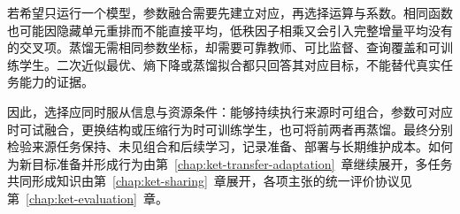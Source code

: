 若希望只运行一个模型，参数融合需要先建立对应，再选择运算与系数。相同函数也可能因隐藏单元重排而不能直接平均，低秩因子相乘又会引入完整增量平均没有的交叉项。蒸馏无需相同参数坐标，却需要可靠教师、可比监督、查询覆盖和可训练学生。二次近似最优、熵下降或蒸馏拟合都只回答其对应目标，不能替代真实任务能力的证据。

因此，选择应同时服从信息与资源条件：能够持续执行来源时可组合，参数可对应时可试融合，更换结构或压缩行为时可训练学生，也可将前两者再蒸馏。最终分别检验来源任务保持、未见组合和后续学习，记录准备、部署与长期维护成本。如何为新目标准备并形成行为由第~\ref{chap:ket-transfer-adaptation}~章继续展开，多任务共同形成知识由第~\ref{chap:ket-sharing}~章展开，各项主张的统一评价协议见第~\ref{chap:ket-evaluation}~章。
